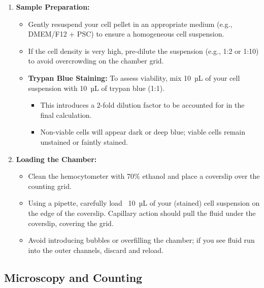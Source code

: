 \documentclass[11pt]{article}
\begin{document}
\begin{enumerate}[leftmargin=*]
    \item \textbf{Sample Preparation:}
    \begin{itemize}[leftmargin=*]
        \item Gently resuspend your cell pellet in an appropriate medium (e.g., DMEM/F12 + PSC) to ensure a homogeneous cell suspension.
        \item If the cell density is very high, pre-dilute the suspension (e.g., 1:2 or 1:10) to avoid overcrowding on the chamber grid.
        \item \textbf{Trypan Blue Staining:} To assess viability, mix 10~µL of your cell suspension with 10~µL of trypan blue (1:1). 
        \begin{itemize}[leftmargin=*]
            \item This introduces a 2-fold dilution factor to be accounted for in the final calculation.
            \item Non-viable cells will appear dark or deep blue; viable cells remain unstained or faintly stained.
        \end{itemize}
    \end{itemize}

    \item \textbf{Loading the Chamber:}
    \begin{itemize}[leftmargin=*]
        \item Clean the hemocytometer with 70\% ethanol and place a coverslip over the counting grid.
        \item Using a pipette, carefully load ~10~µL of your (stained) cell suspension on the edge of the coverslip. Capillary action should pull the fluid under the coverslip, covering the grid.
        \item Avoid introducing bubbles or overfilling the chamber; if you see fluid run into the outer channels, discard and reload.
    \end{itemize}
\end{enumerate}

\subsection{Microscopy and Counting}
\end{document}
